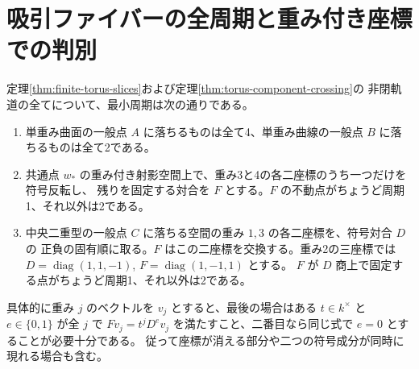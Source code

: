 \section{吸引ファイバーの全周期と重み付き座標での判別}
\label{sec:torus-fiber-periods}
\begin{theorem}\label{thm:torus-fiber-periods}
定理\ref{thm:finite-torus-slices}および定理\ref{thm:torus-component-crossing}の
非閉軌道の全てについて、最小周期は次の通りである。
\begin{enumerate}
\item 単重み曲面の一般点 $A$ に落ちるものは全て4、単重み曲線の一般点 $B$ に落ちるものは全て2である。
\item 共通点 $w_*$ の重み付き射影空間上で、重み3と4の各二座標のうち一つだけを符号反転し、
残りを固定する対合を $F$ とする。$F$ の不動点がちょうど周期1、それ以外は2である。
\item 中央二重型の一般点 $C$ に落ちる空間の重み $1,3$ の各二座標を、符号対合 $D$ の
正負の固有順に取る。$F$ はこの二座標を交換する。重み2の三座標では
$D=\operatorname{diag}(1,1,-1)$, $F=\operatorname{diag}(1,-1,1)$ とする。
$F$ が $D$ 商上で固定する点がちょうど周期1、それ以外は2である。
\end{enumerate}
具体的に重み $j$ のベクトルを $v_j$ とすると、最後の場合はある $t\in k^\times$ と
$e\in\{0,1\}$ が全 $j$ で $Fv_j=t^j D^e v_j$ を満たすこと、二番目なら同じ式で $e=0$ とすることが必要十分である。
従って座標が消える部分や二つの符号成分が同時に現れる場合も含む。
\end{theorem}
